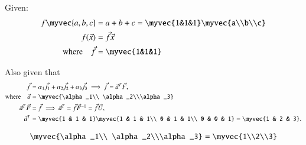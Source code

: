 \documentclass[journal]{article}
\begin{document}
Given:
\begin{align}
f\myvec{a,b,c}&=a+b+c=\myvec{1&1&1}\myvec{a\\b\\c}\\
f(\vec{x})&=\vec{f}\vec{x} \\
\text{where}\quad \vec{f}&=\myvec{1&1&1}
\end{align}

Also given that
\begin{align}
\vec{f} &= \alpha_1 \vec{f}_1 + \alpha_2 \vec{f}_2 + \alpha_3 \vec{f}_3 
\implies \vec{f} = \vec{a}^T \vec{F}, \\
\text{where}\quad\vec{a}&=\myvec{\alpha_1\\ \alpha_2\\\alpha_3} \quad  \\
\vec{a}^T \vec{F} &= \vec{f} \implies \vec{a}^T = \vec{f} \vec{F}^{-1} = \vec{f} \vec{U}, \\
\vec{a}^T &= \myvec{1 & 1 & 1} \myvec{1 & 1 & 1\\ 0 & 1 & 1\\ 0 & 0 & 1} 
= \myvec{1 & 2 & 3}.
\end{align}

\begin{align}
\myvec{\alpha_1\\ \alpha_2\\\alpha_3} = \myvec{1\\2\\3}
\end{align}
\end{document}
